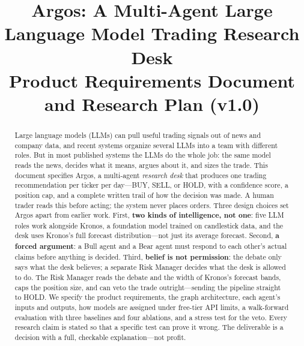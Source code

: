 \documentclass[conference]{IEEEtran}
\newcommand{\sys}{Argos}
\begin{document}
\title{\sys{}: A Multi-Agent Large Language Model Trading Research Desk\\
\large Product Requirements Document and Research Plan (v1.0)}

\author{
}

\maketitle

\begin{abstract}
Large language models (LLMs) can pull useful trading signals out of news and company data, and recent systems organize several LLMs into a team with different roles. But in most published systems the LLMs do the whole job: the same model reads the news, decides what it means, argues about it, and sizes the trade. This document specifies \sys{}, a multi-agent \emph{research desk} that produces one trading recommendation per ticker per day---BUY, SELL, or HOLD, with a confidence score, a position cap, and a complete written trail of how the decision was made. A human trader reads this before acting; the system never places orders. Three design choices set \sys{} apart from earlier work. First, \textbf{two kinds of intelligence, not one}: five LLM roles work alongside Kronos, a foundation model trained on candlestick data, and the desk uses Kronos's full forecast distribution---not just its average forecast. Second, \textbf{a forced argument}: a Bull agent and a Bear agent must respond to each other's actual claims before anything is decided. Third, \textbf{belief is not permission}: the debate only says what the desk believes; a separate Risk Manager decides what the desk is allowed to do. The Risk Manager reads the debate and the width of Kronos's forecast bands, caps the position size, and can veto the trade outright---sending the pipeline straight to HOLD. We specify the product requirements, the graph architecture, each agent's inputs and outputs, how models are assigned under free-tier API limits, a walk-forward evaluation with three baselines and four ablations, and a stress test for the veto. Every research claim is stated so that a specific test can prove it wrong. The deliverable is a decision with a full, checkable explanation---not profit.
\end{abstract}
\end{document}
